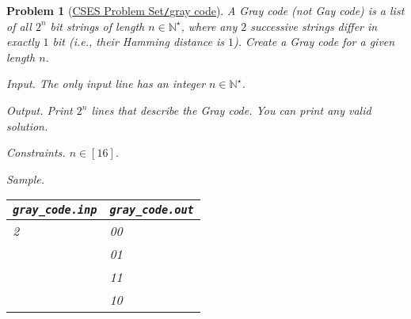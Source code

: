 \documentclass{article}
\newtheorem{problem}{Problem}
\begin{document}
\begin{problem}[\href{https://cses.fi/problemset/task/2205}{CSES Problem Set{\tt/}gray code}]
    A {\rm Gray code} (not Gay code) is a list of all $2^n$ bit strings of length $n\in\mathbb{N}^\star$, where any $2$ successive strings differ in exactly $1$ bit (i.e., their Hamming distance is $1$). Create a Gray code for a given length $n$.
    \item {\sf Input.} The only input line has an integer $n\in\mathbb{N}^\star$.
    \item {\sf Output.} Print $2^n$ lines that describe the Gray code. You can print any valid solution.
    \item {\sf Constraints.} $n\in[16]$.
    \item {\sf Sample.}
    \begin{table}[H]
        \centering
        \begin{tabular}{|l|l|}
            \hline
            \verb|gray_code.inp| & \verb|gray_code.out| \\
            \hline
            2 & 00 \\
            & 01 \\
            & 11 \\
            & 10 \\
            \hline
        \end{tabular}
    \end{table}
\end{problem}
\end{document}
